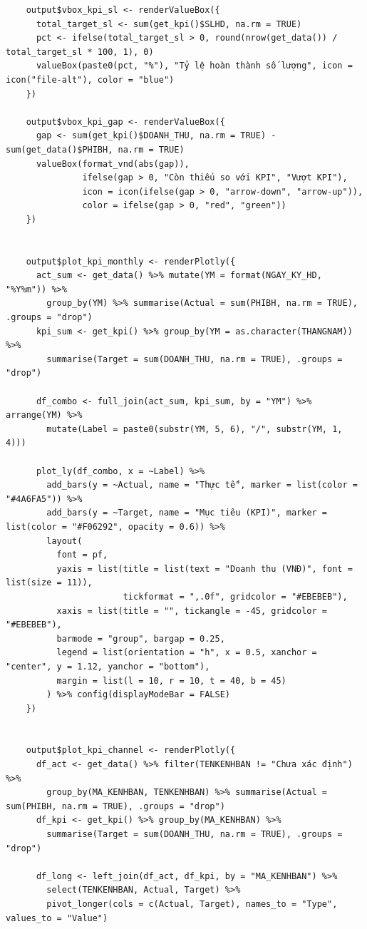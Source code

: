 \documentclass[12pt, a4paper]{article}
\begin{document}
\begin{lstlisting}
    output$vbox_kpi_sl <- renderValueBox({
      total_target_sl <- sum(get_kpi()$SLHD, na.rm = TRUE)
      pct <- ifelse(total_target_sl > 0, round(nrow(get_data()) / total_target_sl * 100, 1), 0)
      valueBox(paste0(pct, "%"), "Tỷ lệ hoàn thành số lượng", icon = icon("file-alt"), color = "blue")
    })

    output$vbox_kpi_gap <- renderValueBox({
      gap <- sum(get_kpi()$DOANH_THU, na.rm = TRUE) - sum(get_data()$PHIBH, na.rm = TRUE)
      valueBox(format_vnd(abs(gap)),
               ifelse(gap > 0, "Còn thiếu so với KPI", "Vượt KPI"),
               icon = icon(ifelse(gap > 0, "arrow-down", "arrow-up")),
               color = ifelse(gap > 0, "red", "green"))
    })


    output$plot_kpi_monthly <- renderPlotly({
      act_sum <- get_data() %>% mutate(YM = format(NGAY_KY_HD, "%Y%m")) %>%
        group_by(YM) %>% summarise(Actual = sum(PHIBH, na.rm = TRUE), .groups = "drop")
      kpi_sum <- get_kpi() %>% group_by(YM = as.character(THANGNAM)) %>%
        summarise(Target = sum(DOANH_THU, na.rm = TRUE), .groups = "drop")

      df_combo <- full_join(act_sum, kpi_sum, by = "YM") %>% arrange(YM) %>%
        mutate(Label = paste0(substr(YM, 5, 6), "/", substr(YM, 1, 4)))

      plot_ly(df_combo, x = ~Label) %>%
        add_bars(y = ~Actual, name = "Thực tế", marker = list(color = "#4A6FA5")) %>%
        add_bars(y = ~Target, name = "Mục tiêu (KPI)", marker = list(color = "#F06292", opacity = 0.6)) %>%
        layout(
          font = pf,
          yaxis = list(title = list(text = "Doanh thu (VNĐ)", font = list(size = 11)),
                       tickformat = ",.0f", gridcolor = "#EBEBEB"),
          xaxis = list(title = "", tickangle = -45, gridcolor = "#EBEBEB"),
          barmode = "group", bargap = 0.25,
          legend = list(orientation = "h", x = 0.5, xanchor = "center", y = 1.12, yanchor = "bottom"),
          margin = list(l = 10, r = 10, t = 40, b = 45)
        ) %>% config(displayModeBar = FALSE)
    })


    output$plot_kpi_channel <- renderPlotly({
      df_act <- get_data() %>% filter(TENKENHBAN != "Chưa xác định") %>%
        group_by(MA_KENHBAN, TENKENHBAN) %>% summarise(Actual = sum(PHIBH, na.rm = TRUE), .groups = "drop")
      df_kpi <- get_kpi() %>% group_by(MA_KENHBAN) %>%
        summarise(Target = sum(DOANH_THU, na.rm = TRUE), .groups = "drop")

      df_long <- left_join(df_act, df_kpi, by = "MA_KENHBAN") %>%
        select(TENKENHBAN, Actual, Target) %>%
        pivot_longer(cols = c(Actual, Target), names_to = "Type", values_to = "Value")


\end{lstlisting}
\end{document}
